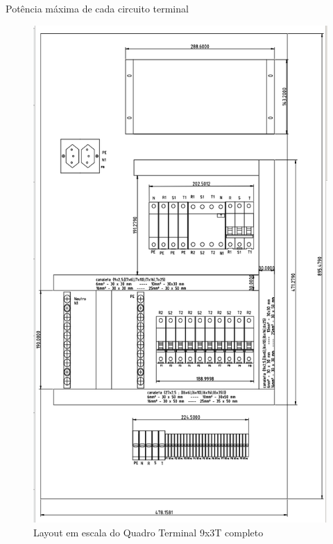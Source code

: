 Potência máxima de cada circuito terminal


\begin{figure}[h]
    \centering
    \includegraphics[width=\textwidth]{image/QD9x3tc.png}
    \caption{Layout em escala do Quadro Terminal 9x3T completo}
   \label{fig:QDlayout9x3}
\end{figure}


